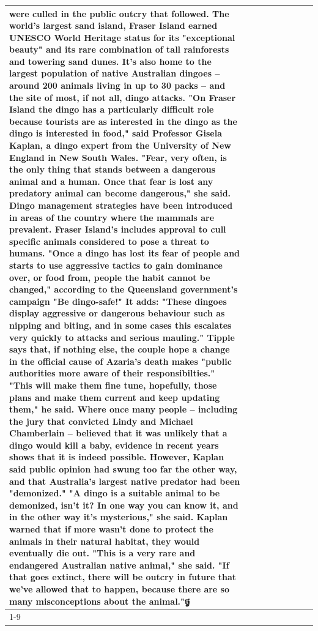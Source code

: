\begin{table}[H]
\begin{tabular}{lllrlllll}
were culled in the public outcry that followed. The world's largest sand island, Fraser Island earned UNESCO World Heritage status for its "exceptional beauty" and its rare combination of tall rainforests and towering sand dunes. It's also home to the largest population of native Australian dingoes -- around 200 animals living in up to 30 packs -- and the site of most, if not all, dingo attacks. "On Fraser Island the dingo has a particularly difficult role because tourists are as interested in the dingo as the dingo is interested in food," said Professor Gisela Kaplan, a dingo expert from the University of New England in New South Wales. "Fear, very often, is the only thing that stands between a dangerous animal and a human. Once that fear is lost any predatory animal can become dangerous," she said. Dingo management strategies have been introduced in areas of the country where the mammals are prevalent. Fraser Island's includes approval to cull specific animals considered to pose a threat to humans. "Once a dingo has lost its fear of people and starts to use aggressive tactics to gain dominance over, or food from, people the habit cannot be changed," according to the Queensland government's campaign "Be dingo-safe!" It adds: "These dingoes display aggressive or dangerous behaviour such as nipping and biting, and in some cases this escalates very quickly to attacks and serious mauling." Tipple says that, if nothing else, the couple hope a change in the official cause of Azaria's death makes "public authorities more aware of their responsibilties." "This will make them fine tune, hopefully, those plans and make them current and keep updating them," he said. Where once many people -- including the jury that convicted Lindy and Michael Chamberlain -- believed that it was unlikely that a dingo would kill a baby, evidence in recent years shows that it is indeed possible. However, Kaplan said public opinion had swung too far the other way, and that Australia's largest native predator had been "demonized." "A dingo is a suitable animal to be demonized, isn't it? In one way you can know it, and in the other way it's mysterious," she said. Kaplan warned that if more wasn't done to protect the animals in their natural habitat, they would eventually die out. "This is a very rare and endangered Australian native animal," she said. "If that goes extinct, there will be outcry in future that we've allowed that to happen, because there are so many misconceptions about the animal."ថ្ង \\
\cline{1-9}

\end{tabular}
\end{table}
